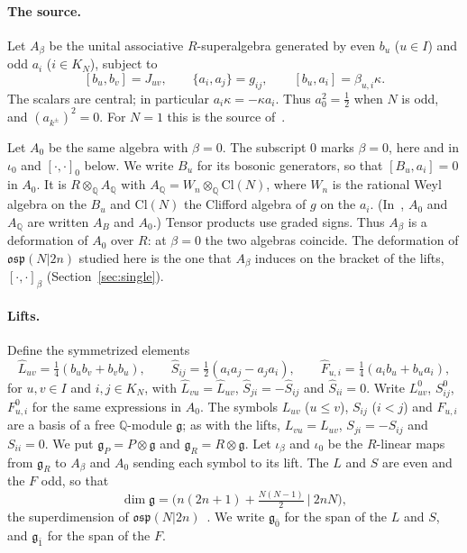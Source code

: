 \documentclass[11pt]{article}
\numberwithin{equation}{section}
\theoremstyle{definition}
\theoremstyle{remark}
\newcommand{\osp}{\mathfrak{osp}}
\begin{document}
\paragraph{The source.} Let $A_\beta$ be the unital associative $R$-superalgebra
generated by even $b_u$ ($u\in I$) and odd $a_i$ ($i\in K_N$), subject to
\begin{equation}\label{eq:source}
 [b_u,b_v]=J_{uv},\qquad \{a_i,a_j\}=g_{ij},\qquad [b_u,a_i]=\beta_{u,i}\kappa .
\end{equation}
The scalars are central; in particular $a_i\kappa=-\kappa a_i$. Thus
$a_0^2=\tfrac12$ when $N$ is odd, and $(a_{k^\pm})^2=0$. For $N=1$ this is the source
of~\cite{Aoi26}.

Let $A_0$ be the same algebra with $\beta=0$. The subscript $0$ marks $\beta=0$, here and in $\iota_0$ and $[\cdot,\cdot]_0$ below. We write $B_u$ for its bosonic
generators, so that $[B_u,a_i]=0$ in $A_0$. It is $R\otimes_{\mathbb Q}A_{\mathbb Q}$ with
$A_{\mathbb Q}=W_n\otimes_{\mathbb Q}\mathrm{Cl}(N)$, where $W_n$ is the rational Weyl algebra
on the $B_u$ and $\mathrm{Cl}(N)$ the Clifford algebra of $g$ on the $a_i$. (In~\cite{Aoi26}, $A_0$ and $A_{\mathbb Q}$ are written $A_B$ and $A_0$.) Tensor
products use graded signs. Thus $A_\beta$ is a deformation of $A_0$ over $R$: at
$\beta=0$ the two algebras coincide. The deformation of $\osp(N|2n)$ studied here is the one that $A_\beta$ induces
on the bracket of the lifts, $[\cdot,\cdot]_\beta$ (Section~\ref{sec:single}).

\paragraph{Lifts.} Define the symmetrized elements
\begin{equation}\label{eq:lifts}
 \widehat L_{uv}=\tfrac14(b_ub_v+b_vb_u),\qquad
 \widehat S_{ij}=\tfrac12(a_ia_j-a_ja_i),\qquad
 \widehat F_{u,i}=\tfrac14(a_ib_u+b_ua_i),
\end{equation}
for $u,v\in I$ and $i,j\in K_N$, with $\widehat L_{vu}=\widehat L_{uv}$, $\widehat S_{ji}=-\widehat S_{ij}$ and
$\widehat S_{ii}=0$. Write $L^0_{uv}$, $S^0_{ij}$, $F^0_{u,i}$ for the same
expressions in $A_0$. The symbols $L_{uv}$
($u\leq v$), $S_{ij}$ ($i<j$) and $F_{u,i}$ are a basis of a free $\mathbb Q$-module
$\mathfrak g$; as with the lifts, $L_{vu}=L_{uv}$, $S_{ji}=-S_{ij}$ and $S_{ii}=0$. We put $\mathfrak g_P=P\otimes\mathfrak g$ and
$\mathfrak g_R=R\otimes\mathfrak g$. Let $\iota_\beta$ and $\iota_0$ be the
$R$-linear maps from $\mathfrak g_R$ to $A_\beta$ and $A_0$ sending each symbol to its
lift. The $L$ and $S$ are even and the $F$ odd, so that
\[
 \dim\mathfrak g=\bigl(n(2n+1)+\tfrac{N(N-1)}{2}\ \big|\ 2nN\bigr),
\]
the superdimension of $\osp(N|2n)$~\cite[\S2.27]{FSS00}. We write $\mathfrak g_{\bar0}$ for the span of the $L$
and $S$, and $\mathfrak g_{\bar1}$ for the span of the $F$.
\end{document}
